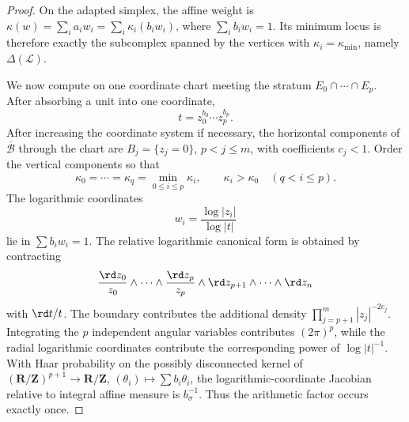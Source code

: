 \begin{proof}
On the adapted simplex, the affine weight is
$\kappa(w)=\sum_i a_iw_i=\sum_i\kappa_i(b_iw_i)$,
where $\sum_i b_iw_i=1$.  Its minimum locus is therefore exactly the
subcomplex spanned by the vertices with
$\kappa_i=\kappa_{\min}$, namely $\Delta(\mathcal L)$.

We now compute on one coordinate chart meeting the stratum
$E_0\cap\cdots\cap E_p$.  After absorbing a unit into one coordinate,
\[
                 t=z_0^{b_0}\cdots z_p^{b_p}.
\]
After increasing the coordinate system if necessary, the horizontal
components of $\overline{\mathcal B}$ through the chart are
$B_j=\{z_j=0\}$, $p<j\leq m$, with coefficients $c_j<1$.
Order the vertical components so that
\[
 \kappa_0=\cdots=\kappa_q
       =\min_{0\leq i\leq p}\kappa_i,
 \qquad
 \kappa_i>\kappa_0\quad(q<i\leq p).
\]
The logarithmic
coordinates
\[
              w_i=\frac{\log|z_i|}{\log|t|}
\]
lie in $\sum b_iw_i=1$.  The relative logarithmic canonical form is
obtained by contracting
\[
 \frac{\rd z_0}{z_0}\wedge\cdots\wedge
 \frac{\rd z_p}{z_p}\wedge
 \rd z_{p+1}\wedge\cdots\wedge\rd z_n
\]
with $\rd t/t$.  The boundary contributes the additional density
$\prod_{j=p+1}^{m}|z_j|^{-2c_j}$.  Integrating the $p$ independent
angular variables contributes $(2\pi)^p$, while the radial logarithmic
coordinates contribute the corresponding power of $\log|t|^{-1}$.
With Haar probability on the possibly disconnected kernel of
$(\mathbf R/\mathbf Z)^{p+1}\to\mathbf R/\mathbf Z$,
$(\theta_i)\mapsto\sum b_i\theta_i$, the logarithmic-coordinate Jacobian
relative to integral affine measure is $b_\sigma^{-1}$.  Thus the
arithmetic factor occurs exactly once.


\end{proof}

